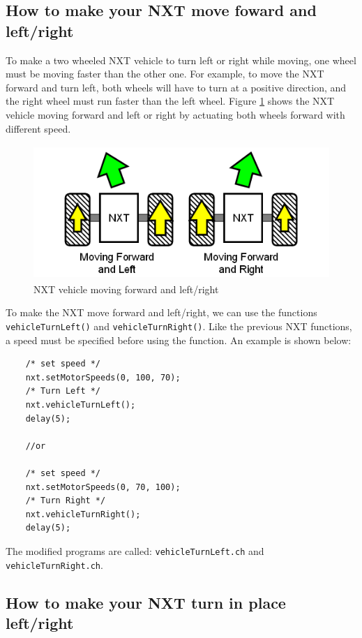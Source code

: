 \subsection{How to make your NXT move foward and left/right}
To make a two wheeled NXT vehicle to turn left or right while moving, one wheel must be moving 
faster than the other one.  For example, to move the NXT forward and turn left, both wheels will 
have to turn at a positive direction, and the right wheel must run faster than the left wheel. 
Figure \ref{fig_NXT_leftright} shows the NXT vehicle moving forward and left or right by actuating
both wheels forward with different speed.\\

\begin{figure}[h]
  \begin{center}
    \includegraphics[height=2in]{figure/mindstorm/Vehicle_LR.png}
    \caption{NXT vehicle moving forward and left/right \label{fig_NXT_leftright}}
  \end{center}
\end{figure}

\noindent
To make the NXT move forward and left/right, we can use the functions \verb+vehicleTurnLeft()+ 
and \verb+vehicleTurnRight()+. Like the previous NXT functions, a speed must be specified before 
using the function.  An example is shown below:
\begin{verbatim}
    /* set speed */
    nxt.setMotorSpeeds(0, 100, 70);
    /* Turn Left */ 
    nxt.vehicleTurnLeft();
    delay(5);
    
    //or
    
    /* set speed */
    nxt.setMotorSpeeds(0, 70, 100);
    /* Turn Right */
    nxt.vehicleTurnRight();
    delay(5);
\end{verbatim}
The modified programs are called: \verb+vehicleTurnLeft.ch+ and \verb+vehicleTurnRight.ch+.

\subsection{How to make your NXT turn in place left/right}

